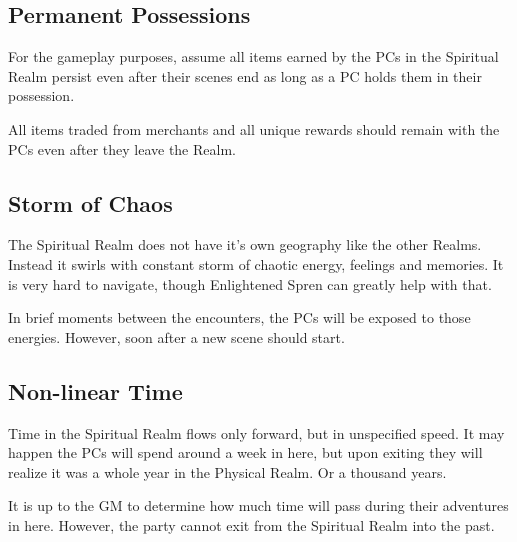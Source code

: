 \subsection{Permanent Possessions}

For the gameplay purposes, assume all items earned by the PCs in the Spiritual Realm persist even after their scenes end as long as a PC holds them in their possession.

All items traded from merchants and all unique rewards should remain with the PCs even after they leave the Realm.


\subsection{Storm of Chaos}

The Spiritual Realm does not have it's own geography like the other Realms. Instead it swirls with constant storm of chaotic energy, feelings and memories. It is very hard to navigate, though Enlightened Spren can greatly help with that.

In brief moments between the encounters, the PCs will be exposed to those energies. However, soon after a new scene should start.


\subsection{Non-linear Time}

Time in the Spiritual Realm flows only forward, but in unspecified speed. It may happen the PCs will spend around a week in here, but upon exiting they will realize it was a whole year in the Physical Realm. Or a thousand years. 

It is up to the GM to determine how much time will pass during their adventures in here. However, the party cannot exit from the Spiritual Realm into the past.